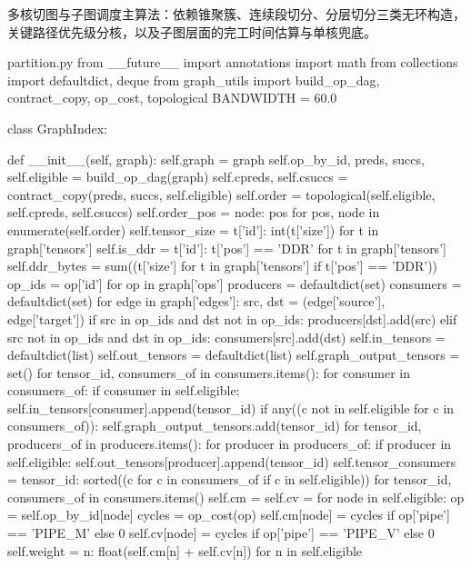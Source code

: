 多核切图与子图调度主算法：依赖锥聚簇、连续段切分、分层切分三类无环构造，关键路径优先级分核，以及子图层面的完工时间估算与单核兜底。

\begin{Python}{partition.py}
from __future__ import annotations
import math
from collections import defaultdict, deque
from graph_utils import build_op_dag, contract_copy, op_cost, topological
BANDWIDTH = 60.0

class GraphIndex:

    def __init__(self, graph):
        self.graph = graph
        self.op_by_id, preds, succs, self.eligible = build_op_dag(graph)
        self.cpreds, self.csuccs = contract_copy(preds, succs, self.eligible)
        self.order = topological(self.eligible, self.cpreds, self.csuccs)
        self.order_pos = {node: pos for pos, node in enumerate(self.order)}
        self.tensor_size = {t['id']: int(t['size']) for t in graph['tensors']}
        self.is_ddr = {t['id']: t['pos'] == 'DDR' for t in graph['tensors']}
        self.ddr_bytes = sum((t['size'] for t in graph['tensors'] if t['pos'] == 'DDR'))
        op_ids = {op['id'] for op in graph['ops']}
        producers = defaultdict(set)
        consumers = defaultdict(set)
        for edge in graph['edges']:
            src, dst = (edge['source'], edge['target'])
            if src in op_ids and dst not in op_ids:
                producers[dst].add(src)
            elif src not in op_ids and dst in op_ids:
                consumers[src].add(dst)
        self.in_tensors = defaultdict(list)
        self.out_tensors = defaultdict(list)
        self.graph_output_tensors = set()
        for tensor_id, consumers_of in consumers.items():
            for consumer in consumers_of:
                if consumer in self.eligible:
                    self.in_tensors[consumer].append(tensor_id)
            if any((c not in self.eligible for c in consumers_of)):
                self.graph_output_tensors.add(tensor_id)
        for tensor_id, producers_of in producers.items():
            for producer in producers_of:
                if producer in self.eligible:
                    self.out_tensors[producer].append(tensor_id)
        self.tensor_consumers = {tensor_id: sorted((c for c in consumers_of if c in self.eligible)) for tensor_id, consumers_of in consumers.items()}
        self.cm = {}
        self.cv = {}
        for node in self.eligible:
            op = self.op_by_id[node]
            cycles = op_cost(op)
            self.cm[node] = cycles if op['pipe'] == 'PIPE_M' else 0
            self.cv[node] = cycles if op['pipe'] == 'PIPE_V' else 0
        self.weight = {n: float(self.cm[n] + self.cv[n]) for n in self.eligible}


\end{Python}
